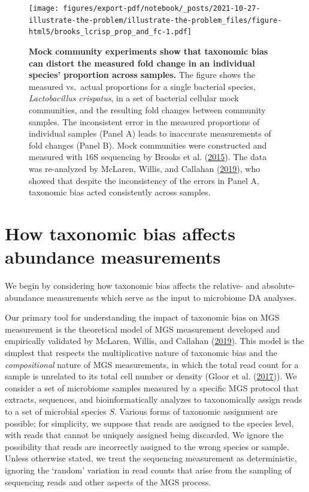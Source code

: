 \documentclass[
]{article}
\begin{document}
\begin{figure}
\centering
\texttt{[image: figures/export-pdf/notebook/\_posts/2021-10-27-illustrate-the-problem/illustrate-the-problem\_files/figure-html5/brooks\_lcrisp\_prop\_and\_fc-1.pdf]}
\caption{\label{fig:basic-problem}\textbf{Mock community experiments show that taxonomic bias can distort the measured fold change in an individual species' proportion across samples.} The figure shows the measured vs.~actual proportions for a single bacterial species, \emph{Lactobacillus crispatus}, in a set of bacterial cellular mock communities, and the resulting fold changes between community samples. The inconsistent error in the measured proportions of individual samples (Panel A) leads to inaccurate measurements of fold changes (Panel B). Mock communities were constructed and measured with 16S sequencing by Brooks et al. (\protect\hyperlink{ref-brooks2015thet}{2015}). The data was re-analyzed by McLaren, Willis, and Callahan (\protect\hyperlink{ref-mclaren2019cons}{2019}), who showed that despite the inconsistency of the errors in Panel A, taxonomic bias acted consistently across samples.}
\end{figure}



\hypertarget{abundance-measurement}{%
\section{How taxonomic bias affects abundance measurements}\label{abundance-measurement}}

We begin by considering how taxonomic bias affects the relative- and absolute-abundance measurements which serve as the input to microbiome DA analyses.

Our primary tool for understanding the impact of taxonomic bias on MGS measurement is the theoretical model of MGS measurement developed and empirically validated by McLaren, Willis, and Callahan (\protect\hyperlink{ref-mclaren2019cons}{2019}).
This model is the simplest that respects the multiplicative nature of taxonomic bias and the \emph{compositional} nature of MGS measurements, in which the total read count for a sample is unrelated to its total cell number or density (Gloor et al. (\protect\hyperlink{ref-gloor2017micr}{2017})).
We consider a set of microbiome samples measured by a specific MGS protocol that extracts, sequences, and bioinformatically analyzes to taxonomically assign reads to a set of microbial species \(S\).
Various forms of taxonomic assignment are possible; for simplicity, we suppose that reads are assigned to the species level, with reads that cannot be uniquely assigned being discarded.
We ignore the possibility that reads are incorrectly assigned to the wrong species or sample.
Unless otherwise stated, we treat the sequencing measurement as deterministic, ignoring the `random' variation in read counts that arise from the sampling of sequencing reads and other aspects of the MGS process.
\end{document}
